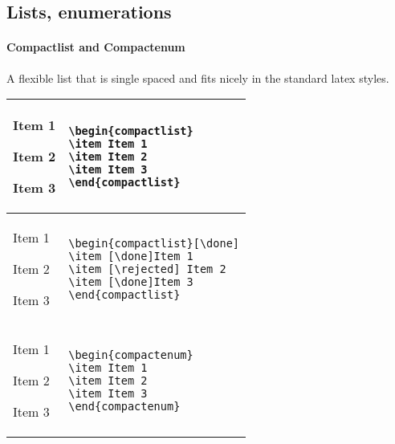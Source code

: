 \documentclass[a4paper,12pt]{article}
\begin{document}
\subsection{Lists, enumerations}

\paragraph{Compactlist and Compactenum}

A flexible list that is single spaced and fits nicely in the standard latex styles. 

\begin{longtable}{m{5cm} m{8cm}}
\endfirsthead
\endhead
\endfoot
\endlastfoot

\hline
\begin{compactlist}
\item Item 1
\item Item 2
\item Item 3
\end{compactlist}
&
	\begin{verbatim}
\begin{compactlist}
\item Item 1
\item Item 2
\item Item 3
\end{compactlist}
	\end{verbatim}\\
\hline


\begin{compactlist}[\done]
\item Item 1
\item [\rejected] Item 2
\item Item 3
\end{compactlist}
&
\begin{verbatim}
\begin{compactlist}[\done]
\item [\done]Item 1
\item [\rejected] Item 2
\item [\done]Item 3
\end{compactlist}
\end{verbatim}\\
\hline

\begin{compactenum}
\item Item 1
\item Item 2
\item Item 3
\end{compactenum}
&
\begin{verbatim}
\begin{compactenum}
\item Item 1
\item Item 2
\item Item 3
\end{compactenum}
\end{verbatim}\\
\hline


\end{longtable}
\end{document}
